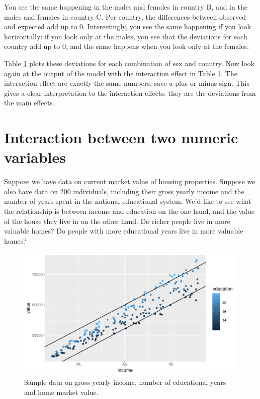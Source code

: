 \documentclass[]{report}\usepackage[]{graphicx}\usepackage[]{color}
\makeatletter
\def\maxwidth{ %
  \ifdim\Gin@nat@width>\linewidth
    \linewidth
  \else
    \Gin@nat@width
  \fi
}
\makeatother
\begin{document}
You see the same happening in the males and females in country B, and in the males and females in country C. Per country, the differences between observed and expected add up to 0. Interestingly, you see the same happening if you look horizontally: if you look only at the males, you see that the deviations for each country add up to 0, and the same happens when you look only at the females. 

Table \ref{} plots these deviations for each combination of sex and country. Now look again at the output of the model with the interaction effect in Table \ref{}. The interaction effect are exactly the same numbers, save a plus or minus sign. This gives a clear interpretation to the interaction effects: they are the deviations from the main effects. 










\section{Interaction between two numeric variables}

Suppose we have data on current market value of housing properties. Suppose we also have data on 200 individuals, including their gross yearly income and the number of years spent in the national educational system. We'd like to see what the relationship is between income and education on the one hand, and the value of the house they live in on the other hand. Do richer people live in more valuable homes? Do people with more educational years live in more valuable homes? 

\begin{figure}

{\centering \includegraphics[width=\maxwidth]{figure/linearbylinear_1-1} 

}

\caption[Sample data on gross yearly income, number of educational years and home market value]{Sample data on gross yearly income, number of educational years and home market value.}\label{fig:linearbylinear_1}
\end{figure}
\end{document}
